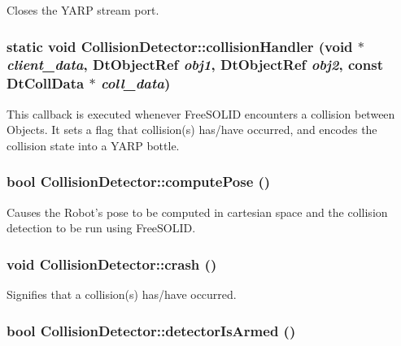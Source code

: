 Closes the YARP stream port. \hypertarget{class_collision_detector_a4899ce7cf1ba8c2efe37329e49aff128}{
\subsubsection[{collisionHandler}]{\setlength{\rightskip}{0pt plus 5cm}static void CollisionDetector::collisionHandler (void $\ast$ {\em client\_\-data}, \/  DtObjectRef {\em obj1}, \/  DtObjectRef {\em obj2}, \/  const DtCollData $\ast$ {\em coll\_\-data})}}
\label{class_collision_detector_a4899ce7cf1ba8c2efe37329e49aff128}
This callback is executed whenever FreeSOLID encounters a collision between Objects. It sets a flag that collision(s) has/have occurred, and encodes the collision state into a YARP bottle. \hypertarget{class_collision_detector_a92faad68f69ade7020a58f105f7d3aa8}{
\subsubsection[{computePose}]{\setlength{\rightskip}{0pt plus 5cm}bool CollisionDetector::computePose ()}}
\label{class_collision_detector_a92faad68f69ade7020a58f105f7d3aa8}


Causes the Robot's pose to be computed in cartesian space and the collision detection to be run using FreeSOLID. \hypertarget{class_collision_detector_a7a6c1a9b11907db7252b6544ee1ce8b4}{
\subsubsection[{crash}]{\setlength{\rightskip}{0pt plus 5cm}void CollisionDetector::crash ()}}
\label{class_collision_detector_a7a6c1a9b11907db7252b6544ee1ce8b4}


Signifies that a collision(s) has/have occurred. \hypertarget{class_collision_detector_adda71d45cdd4a428945f6a8e9c750296}{
\subsubsection[{detectorIsArmed}]{\setlength{\rightskip}{0pt plus 5cm}bool CollisionDetector::detectorIsArmed ()}}
\label{class_collision_detector_adda71d45cdd4a428945f6a8e9c750296}


